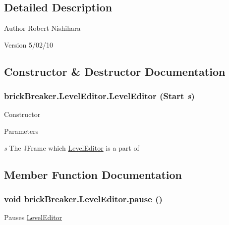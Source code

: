 \subsection{Detailed Description}
\begin{DoxyAuthor}{Author}
Robert Nishihara 
\end{DoxyAuthor}
\begin{DoxyVersion}{Version}
5/02/10 
\end{DoxyVersion}


\subsection{Constructor \& Destructor Documentation}
\hypertarget{classbrick_breaker_1_1_level_editor_a7bd55dad6633ded18cb4fad7cf6bbeac}{
\subsubsection[{LevelEditor}]{\setlength{\rightskip}{0pt plus 5cm}brickBreaker.LevelEditor.LevelEditor ({\bf Start} {\em s})}}
\label{classbrick_breaker_1_1_level_editor_a7bd55dad6633ded18cb4fad7cf6bbeac}
Constructor


\begin{DoxyParams}{Parameters}
\item[{\em s}]The JFrame which \hyperlink{classbrick_breaker_1_1_level_editor}{LevelEditor} is a part of \end{DoxyParams}


\subsection{Member Function Documentation}
\hypertarget{classbrick_breaker_1_1_level_editor_a5c1da01da393e14dbd38039bc457f713}{
\subsubsection[{pause}]{\setlength{\rightskip}{0pt plus 5cm}void brickBreaker.LevelEditor.pause ()}}
\label{classbrick_breaker_1_1_level_editor_a5c1da01da393e14dbd38039bc457f713}
Pauses \hyperlink{classbrick_breaker_1_1_level_editor}{LevelEditor} 

